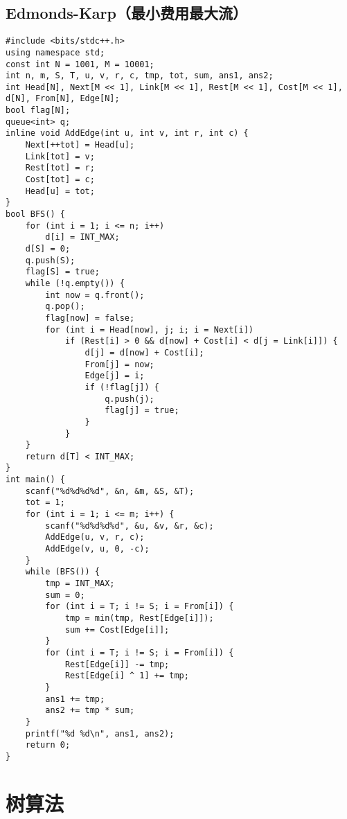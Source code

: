 \documentclass[a4paper]{article}
\begin{document}
\subsection{Edmonds-Karp（最小费用最大流）}
\begin{lstlisting}
#include <bits/stdc++.h>
using namespace std;
const int N = 1001, M = 10001;
int n, m, S, T, u, v, r, c, tmp, tot, sum, ans1, ans2;
int Head[N], Next[M << 1], Link[M << 1], Rest[M << 1], Cost[M << 1], d[N], From[N], Edge[N];
bool flag[N];
queue<int> q;
inline void AddEdge(int u, int v, int r, int c) {
    Next[++tot] = Head[u];
    Link[tot] = v;
    Rest[tot] = r;
    Cost[tot] = c;
    Head[u] = tot;
}
bool BFS() {
    for (int i = 1; i <= n; i++)
        d[i] = INT_MAX;
    d[S] = 0;
    q.push(S);
    flag[S] = true;
    while (!q.empty()) {
        int now = q.front();
        q.pop();
        flag[now] = false;
        for (int i = Head[now], j; i; i = Next[i])
            if (Rest[i] > 0 && d[now] + Cost[i] < d[j = Link[i]]) {
                d[j] = d[now] + Cost[i];
                From[j] = now;
                Edge[j] = i;
                if (!flag[j]) {
                    q.push(j);
                    flag[j] = true;
                }
            }
    }
    return d[T] < INT_MAX;
}
int main() {
    scanf("%d%d%d%d", &n, &m, &S, &T);
    tot = 1;
    for (int i = 1; i <= m; i++) {
        scanf("%d%d%d%d", &u, &v, &r, &c);
        AddEdge(u, v, r, c);
        AddEdge(v, u, 0, -c);
    }
    while (BFS()) {
        tmp = INT_MAX;
        sum = 0;
        for (int i = T; i != S; i = From[i]) {
            tmp = min(tmp, Rest[Edge[i]]);
            sum += Cost[Edge[i]];
        }
        for (int i = T; i != S; i = From[i]) {
            Rest[Edge[i]] -= tmp;
            Rest[Edge[i] ^ 1] += tmp;
        }
        ans1 += tmp;
        ans2 += tmp * sum;
    }
    printf("%d %d\n", ans1, ans2);
    return 0;
}
\end{lstlisting}
\section{树算法}
\end{document}
